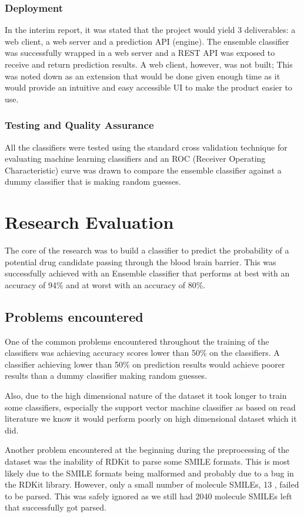 \documentclass[a4paper,12pt]{article}
\begin{document}
		\subsubsection{Deployment}
		In the interim report, it was stated that the project would yield 3 deliverables: a web client, a web server and a prediction API (engine). The ensemble classifier was successfully wrapped in a web server and a REST API was exposed to receive and return prediction results. A web client, however, was not built; This was noted down as an extension that would be done given enough time as it would provide an intuitive and easy accessible UI to make the product easier to use.
		\subsubsection{Testing and Quality Assurance}
		All the classifiers were tested using the standard cross validation technique for evaluating machine learning classifiers and an ROC (Receiver Operating Characteristic) curve was drawn to compare the ensemble classifier against a dummy classifier that is making random guesses.
	

\section{Research Evaluation}
	The core of the research was to build a classifier to predict the probability of a potential drug candidate passing through the blood brain barrier. This was successfully achieved with an Ensemble classifier that performs at best with an accuracy of 94\% and at worst with an accuracy of 80\%.
	
	\subsection{Problems encountered}
	One of the common problems encountered throughout the training of the classifiers was achieving accuracy scores lower than 50\% on the classifiers. A classifier achieving lower than 50\% on prediction results would achieve poorer results than a dummy classifier making random guesses. 
	
	Also, due to the high dimensional nature of the dataset it took longer to train some classifiers, especially the support vector machine classifier as based on read literature we know it would perform poorly on high dimensional dataset which it did.
	
	Another problem encountered at the beginning during the preprocessing of the dataset was the inability of RDKit to parse some SMILE formats. This is most likely due to the SMILE formats being malformed and probably due to a bug in the RDKit library. However, only a small number of molecule SMILEs, 13 , failed to be parsed. This was safely ignored as we still had 2040 molecule SMILEs left that successfully got parsed.
	
\end{document}
